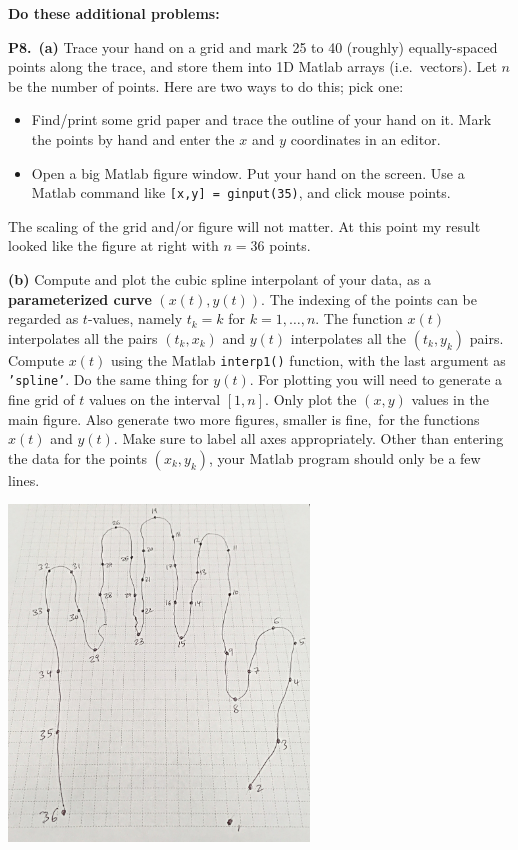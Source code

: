 \documentclass[12pt]{amsart}
\newcommand{\prob}[1]{\bigskip\noindent\textbf{#1.}\quad }
\newcommand{\epart}[1]{\medskip\noindent\textbf{(#1)}\quad }
\newcommand{\ppart}[1]{\,\textbf{(#1)}\quad }
\begin{document}
\medskip

\noindent \textbf{Do these additional problems:}

\prob{P8}  \ppart{a}  Trace your hand on a grid and mark 25 to 40 (roughly) equally-spaced points along the trace, and store them into 1D Matlab arrays (i.e.~vectors).  Let $n$ be the number of points.  Here are two ways to do this; pick one:
\begin{itemize}
\item Find/print some grid paper and trace the outline of your hand on it.  Mark the points by hand and enter the $x$ and $y$ coordinates in an editor.
\item Open a big Matlab figure window.  Put your hand on the screen.  Use a Matlab command like \verb|[x,y] = ginput(35)|, and click mouse points.
\end{itemize}

\noindent \begin{minipage}[t]{0.6\textwidth}
The scaling of the grid and/or figure will not matter.  At this point my result looked like the figure at right with $n=36$ points.

\epart{b} Compute and plot the cubic spline interpolant of your data, as a \textbf{parameterized curve} $(x(t),y(t))$.  The indexing of the points can be regarded as $t$-values, namely $t_k=k$ for $k=1,\dots,n$.  The function $x(t)$ interpolates all the pairs $(t_k,x_k)$ and $y(t)$ interpolates all the $(t_k,y_k)$ pairs.  Compute $x(t)$ using the Matlab \texttt{interp1()} function, with the last argument as \texttt{'spline'}.  Do the same thing for $y(t)$.  For plotting you will need to generate a fine grid of $t$ values on the interval $[1,n]$.  Only plot the $(x,y)$ values in the main figure.  Also generate two more figures, smaller is fine,\footnotemark\, for the functions $x(t)$ and $y(t)$.  Make sure to label all axes appropriately.  Other than entering the data for the points $(x_k,y_k)$, your Matlab program should only be a few lines.
\end{minipage}
\begin{minipage}[t]{0.7\textwidth}
\vspace{0pt}

\quad \includegraphics[width=0.6\textwidth]{figs/myhand.jpg}
\end{minipage}
\end{document}
